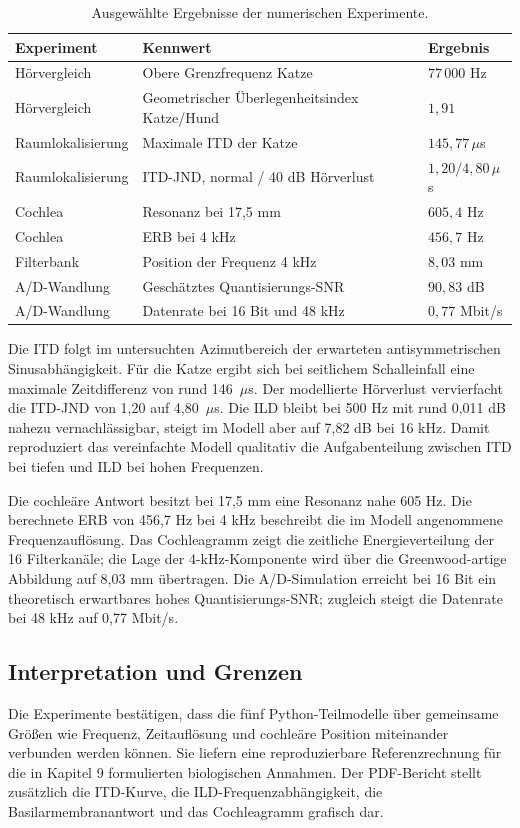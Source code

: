 ﻿\documentclass[12pt, a4paper]{article}
\theoremstyle{definition}
\theoremstyle{remark}
\begin{document}
\begin{table}[H]
\centering
\caption{Ausgewählte Ergebnisse der numerischen Experimente.}
\label{tab:python_experimente}
\begin{tabular}{lll}
\toprule
Experiment & Kennwert & Ergebnis \\
\midrule
Hörvergleich & Obere Grenzfrequenz Katze & $77\,000$ Hz \\
Hörvergleich & Geometrischer Überlegenheitsindex Katze/Hund & $1{,}91$ \\
Raumlokalisierung & Maximale ITD der Katze & $145{,}77\,\mu$s \\
Raumlokalisierung & ITD-JND, normal / 40 dB Hörverlust & $1{,}20 / 4{,}80\,\mu$s \\
Cochlea & Resonanz bei 17,5 mm & $605{,}4$ Hz \\
Cochlea & ERB bei 4 kHz & $456{,}7$ Hz \\
Filterbank & Position der Frequenz 4 kHz & $8{,}03$ mm \\
A/D-Wandlung & Geschätztes Quantisierungs-SNR & $90{,}83$ dB \\
A/D-Wandlung & Datenrate bei 16 Bit und 48 kHz & $0{,}77$ Mbit/s \\
\bottomrule
\end{tabular}
\end{table}

Die ITD folgt im untersuchten Azimutbereich der erwarteten antisymmetrischen
Sinusabhängigkeit. Für die Katze ergibt sich bei seitlichem Schalleinfall eine
maximale Zeitdifferenz von rund 146~$\mu$s. Der modellierte Hörverlust
vervierfacht die ITD-JND von 1,20 auf 4,80~$\mu$s. Die ILD bleibt bei 500 Hz
mit rund 0,011 dB nahezu vernachlässigbar, steigt im Modell aber auf 7,82 dB
bei 16 kHz. Damit reproduziert das vereinfachte Modell qualitativ die
Aufgabenteilung zwischen ITD bei tiefen und ILD bei hohen Frequenzen.

Die cochleäre Antwort besitzt bei 17,5 mm eine Resonanz nahe 605 Hz. Die
berechnete ERB von 456,7 Hz bei 4 kHz beschreibt die im Modell angenommene
Frequenzauflösung. Das Cochleagramm zeigt die zeitliche Energieverteilung der
16 Filterkanäle; die Lage der 4-kHz-Komponente wird über die Greenwood-artige
Abbildung auf 8,03 mm übertragen. Die A/D-Simulation erreicht bei 16 Bit ein
theoretisch erwartbares hohes Quantisierungs-SNR; zugleich steigt die Datenrate
bei 48 kHz auf 0,77 Mbit/s.

\subsection{Interpretation und Grenzen}
Die Experimente bestätigen, dass die fünf Python-Teilmodelle über gemeinsame
Größen wie Frequenz, Zeitauflösung und cochleäre Position miteinander verbunden
werden können. Sie liefern eine reproduzierbare Referenzrechnung für die in
Kapitel 9 formulierten biologischen Annahmen. Der PDF-Bericht stellt zusätzlich
die ITD-Kurve, die ILD-Frequenzabhängigkeit, die Basilarmembranantwort und das
Cochleagramm grafisch dar.
\end{document}
